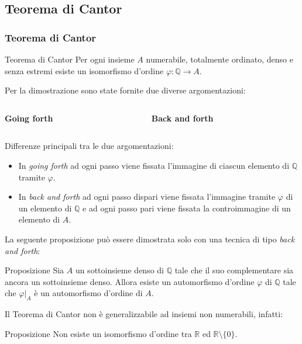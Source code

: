 \documentclass[italian, aspectratio=169,bookmarks=false]{beamer}
\newcommand{\Q}{\mathbb{Q}} %
\newcommand{\R}{\mathbb{R}} %
\newcommand{\0}{\setminus\{0\}} %
\theoremstyle{definition}
\theoremstyle{plain}
\begin{document}
\subsection{Teorema di Cantor}
\begin{frame}
    \frametitle{Teorema di Cantor}
    \begin{alertblock}{Teorema di Cantor}
        Per ogni insieme $A$ numerabile, totalmente ordinato, denso e senza estremi esiste un isomorfismo d'ordine $\varphi: \Q \rightarrow A$.
    \end{alertblock} \pause
    \medskip Per la dimostrazione sono state fornite due diverse argomentazioni: \pause
    \bigskip
    \begin{columns}
        \begin{column}{0.5\textwidth}
            \centering
            \bf{Going forth}
        \end{column}
        \begin{column}{0.5\textwidth}
            \centering
            \bf{Back and forth}
        \end{column}
    \end{columns}
\end{frame}
\begin{frame}
    Differenze principali tra le due argomentazioni:
    \begin{itemize}
        \item In \emph{going forth} ad ogni passo viene fissata l'immagine di ciascun elemento di $\Q$ tramite $\varphi$. \pause
        \item In \emph{back and forth} ad ogni passo dispari viene fissata l'immagine tramite $\varphi$ di un elemento di $\Q$ e ad ogni passo pari viene fissata la controimmagine di un elemento di $A$.
    \end{itemize} \pause
    La seguente proposizione può essere dimostrata solo con una tecnica di tipo \emph{back and forth}: \pause
    \begin{alertblock}{Proposizione}
        Sia $A$ un sottoinsieme denso di $\Q$ tale che il suo complementare sia ancora un sottoinsieme denso. Allora esiste un automorfismo d'ordine $\varphi$ di $\Q$ tale che ${\varphi|_A}$ è un automorfismo d'ordine di $A$.
    \end{alertblock}
\end{frame}
\begin{frame}
    Il Teorema di Cantor non è generalizzabile ad insiemi non numerabili, infatti:
    \begin{alertblock}{Proposizione}
        Non esiste un isomorfismo d'ordine tra $\R$ ed $\R\0$.
    \end{alertblock}
\end{frame}
\end{document}
